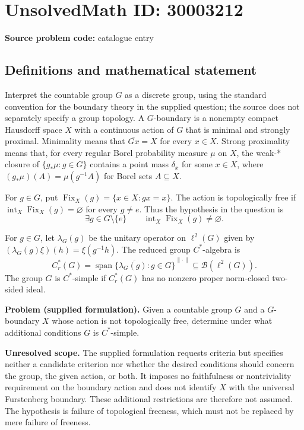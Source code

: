 \documentclass[11pt]{article}
\begin{document}
\section*{UnsolvedMath ID: 30003212}
\textbf{Source problem code:} catalogue entry
\subsection{Definitions and mathematical statement}
Interpret the countable group \(G\) as a discrete group, using the standard convention for the boundary theory in the supplied question; the source does not separately specify a group topology. A \(G\)-boundary is a nonempty compact Hausdorff space \(X\) with a continuous action of \(G\) that is minimal and strongly proximal. Minimality means that \(\overline{Gx}=X\) for every \(x\in X\). Strong proximality means that, for every regular Borel probability measure \(\mu\) on \(X\), the weak-* closure of \(\{g_*\mu:g\in G\}\) contains a point mass \(\delta_x\) for some \(x\in X\), where \((g_*\mu)(A)=\mu(g^{-1}A)\) for Borel sets \(A\subseteq X\).

For \(g\in G\), put \(\operatorname{Fix}_X(g)=\{x\in X:gx=x\}\). The action is topologically free if \(\operatorname{int}_X\operatorname{Fix}_X(g)=\varnothing\) for every \(g\ne e\). Thus the hypothesis in the question is
\[
\exists g\in G\setminus\{e\}\qquad \operatorname{int}_X\operatorname{Fix}_X(g)\ne\varnothing.
\]

For \(g\in G\), let \(\lambda_G(g)\) be the unitary operator on \(\ell^2(G)\) given by \((\lambda_G(g)\xi)(h)=\xi(g^{-1}h)\). The reduced group \(C^*\)-algebra is
\[
C_r^*(G)=\overline{\operatorname{span}\{\lambda_G(g):g\in G\}}^{\|\cdot\|}\subseteq\mathcal B(\ell^2(G)).
\]
The group \(G\) is \(C^*\)-simple if \(C_r^*(G)\) has no nonzero proper norm-closed two-sided ideal.

\textbf{Problem (supplied formulation).} Given a countable group \(G\) and a \(G\)-boundary \(X\) whose action is not topologically free, determine under what additional conditions \(G\) is \(C^*\)-simple.

\textbf{Unresolved scope.} The supplied formulation requests criteria but specifies neither a candidate criterion nor whether the desired conditions should concern the group, the given action, or both. It imposes no faithfulness or nontriviality requirement on the boundary action and does not identify \(X\) with the universal Furstenberg boundary. These additional restrictions are therefore not assumed. The hypothesis is failure of topological freeness, which must not be replaced by mere failure of freeness.
\end{document}
